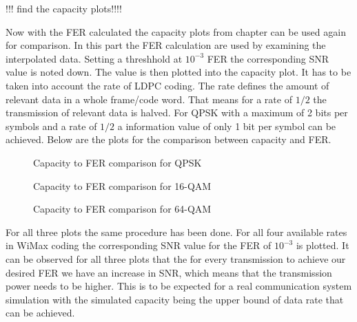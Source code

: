 !!! find the capacity plots!!!!

Now with the  \gls{FER} calculated the capacity plots from chapter  can be used again for comparison. In this part the FER calculation are used by examining the interpolated data. Setting a threshhold at $10^{-3}$ FER the corresponding SNR value is noted down. The value is then plotted into the capacity plot. It has to be taken into account the rate of \gls{LDPC} coding. The rate defines the amount of relevant data in a whole frame/code word. That means for a rate of $1/2$ the transmission of relevant data is halved. For QPSK with a maximum of 2 bits per symbols and a rate of $1/2$ a information value of only 1 bit per symbol can be achieved.
\newline
Below are the plots for the comparison between capacity and \gls{FER}.
\begin{figure}[!htb]
	\setlength{}
	\setlength\fheight{0.4\textheight}
	\centering
	
	\caption{Capacity to FER comparison for QPSK}
	\label{fig:llr}
\end{figure}
\begin{figure}[!htb]
	\setlength{}
	\setlength\fheight{0.4\textheight}	
	\centering
	
	\caption{Capacity to FER comparison for 16-QAM}
	\label{fig:llr}
\end{figure}
\begin{figure}[!htb]
	\setlength{}
	\setlength\fheight{0.4\textheight}
	\centering
	
	\caption{Capacity to FER comparison for 64-QAM}
	\label{fig:llr}
\end{figure}
\newpage
For all three plots the same procedure has been done. For all four available rates in WiMax coding the corresponding SNR value for the \gls{FER} of $10^{-3}$ is plotted. It can be observed for all three plots that the for every transmission to achieve our desired \gls{FER} we have an increase in SNR, which means that the transmission power needs to be higher. This is to be expected for a real communication system simulation with the simulated capacity being the upper bound of data rate that can be achieved. 

\clearpage



